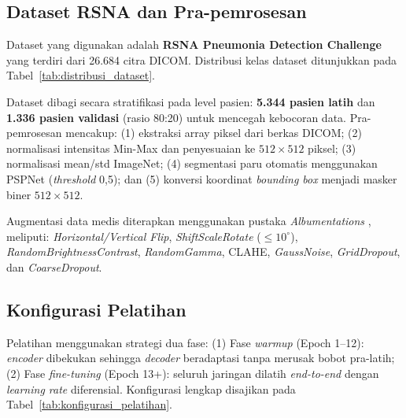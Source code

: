 \documentclass[12pt,a4paper,twocolumn]{article}
\newcommand{\parencite}[1]{\citep{#1}}
\begin{document}
\subsection{Dataset RSNA dan Pra-pemrosesan}

Dataset yang digunakan adalah \textbf{RSNA Pneumonia Detection Challenge}
yang terdiri dari 26.684 citra DICOM. Distribusi kelas dataset ditunjukkan
pada Tabel~\ref{tab:distribusi_dataset}.

\begin{table}[H]
  \centering
  \caption{Distribusi Kelas Dataset RSNA Pneumonia.}
  \label{tab:distribusi_dataset}
\end{table}

Dataset dibagi secara stratifikasi pada level pasien: \textbf{5.344 pasien
latih} dan \textbf{1.336 pasien validasi} (rasio 80:20) untuk mencegah
kebocoran data. Pra-pemrosesan mencakup: (1) ekstraksi array piksel dari berkas
DICOM; (2) normalisasi intensitas Min-Max dan penyesuaian ke $512 \times 512$
piksel; (3) normalisasi mean/std ImageNet; (4) segmentasi paru otomatis
menggunakan PSPNet (\textit{threshold} 0,5); dan (5) konversi koordinat
\textit{bounding box} menjadi masker biner $512 \times 512$.

Augmentasi data medis diterapkan menggunakan pustaka \textit{Albumentations}
\parencite{seth2022}, meliputi: \textit{Horizontal/Vertical Flip},
\textit{ShiftScaleRotate} (${\le}10^{\circ}$), \textit{RandomBrightnessContrast},
\textit{RandomGamma}, CLAHE, \textit{GaussNoise}, \textit{GridDropout}, dan
\textit{CoarseDropout}.

\subsection{Konfigurasi Pelatihan}

Pelatihan menggunakan strategi dua fase: (1) Fase \textit{warmup} (Epoch 1--12):
\textit{encoder} dibekukan sehingga \textit{decoder} beradaptasi tanpa merusak
bobot pra-latih; (2) Fase \textit{fine-tuning} (Epoch 13+): seluruh jaringan
dilatih \textit{end-to-end} dengan \textit{learning rate} diferensial.
Konfigurasi lengkap disajikan pada Tabel~\ref{tab:konfigurasi_pelatihan}.
\end{document}
